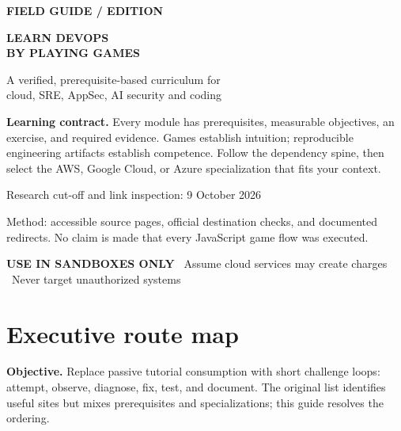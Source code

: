 \documentclass[10pt,letterpaper,oneside]{article}
\begin{document}
\begin{titlepage}
\thispagestyle{empty}
\vspace*{14mm}
{\sffamily\bfseries\large\color{accent}FIELD GUIDE \quad /  EDITION}\par
\vspace{13mm}
{\sffamily\bfseries\fontsize{35}{39}\selectfont\color{ink}LEARN DEVOPS\\[2mm]BY PLAYING GAMES}\par
\vspace{5mm}
{\sffamily\Large\color{mid}A verified, prerequisite-based curriculum for\\ cloud, SRE, AppSec, AI security and coding}\par
\vspace{17mm}
\vspace{14mm}
\begin{notebox}
\textbf{Learning contract.} Every module has prerequisites, measurable objectives, an exercise, and required evidence. Games establish intuition; reproducible engineering artifacts establish competence. Follow the dependency spine, then select the AWS, Google Cloud, or Azure specialization that fits your context.
\end{notebox}
\vfill
{\sffamily\color{mid}Research cut-off and link inspection: 9 October 2026}\par
{\sffamily\color{mid}Method: accessible source pages, official destination checks, and documented redirects. No claim is made that every JavaScript game flow was executed.}\par
\vspace{7mm}
{\sffamily\small\color{accent}\textbf{USE IN SANDBOXES ONLY} \textbullet\ Assume cloud services may create charges \textbullet\ Never target unauthorized systems}
\end{titlepage}
\tableofcontents
\clearpage
{}
\section{Executive route map}
\textbf{Objective.} Replace passive tutorial consumption with short challenge loops: attempt, observe, diagnose, fix, test, and document. The original list identifies useful sites but mixes prerequisites and specializations; this guide resolves the ordering.
\end{document}
